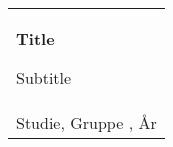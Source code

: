 %
\begin{titlepage}
\vspace*{\fill}
  \addtolength{\hoffset}{0.5\evensidemargin-0.5\oddsidemargin} %
  \noindent%
  {\color{white}\colorbox{aaublue}{\begin{tabular}{@{}p{\textwidth}@{}}
    \begin{center}
    \Huge{\textbf{
        Title%
    }}
    \end{center}
    \begin{center}
      \Large{
        Subtitle %
      }
    \end{center}
    \vspace{0.2cm}
   \begin{center}
    {\Large
      First Last, 
      First Last, 
      First Last, 
      First Last, 
      First Last,
      First Last
    }\\
    \vspace{0.2cm}
    {\large
      Studie, Gruppe , År%
    }
   \end{center}
   \vspace{0.2cm}
   \begin{center}
    {\Large
      Tema
    }
   \end{center}
  \end{tabular}}}
  \vfill

\end{titlepage}
\clearpage
